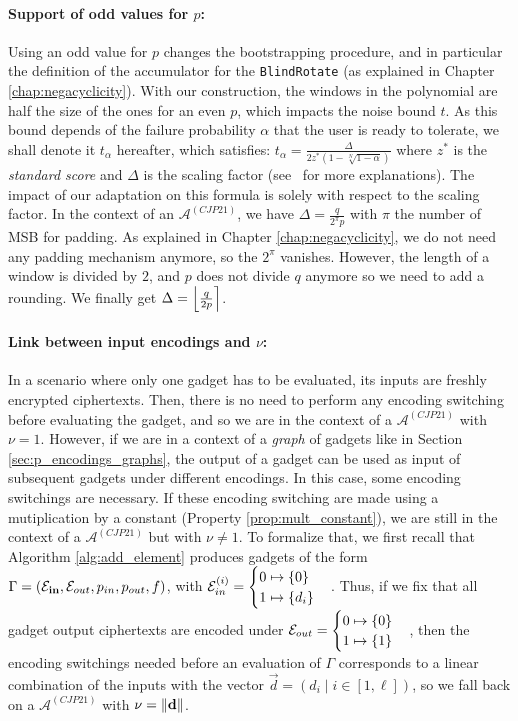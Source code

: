 \paragraph{Support of odd values for $p$:} Using an odd value for $p$ changes the bootstrapping procedure, and in particular the definition of the accumulator for the \texttt{BlindRotate} (as explained in Chapter \ref{chap:negacyclicity}). With our construction, the windows in the polynomial are half the size of the ones for an even $p$, which impacts the noise bound $t$. 
As this bound depends of the failure probability $\alpha$ that the user is ready to tolerate, we shall denote it $t_\alpha$ hereafter, which satisfies: $t_\alpha = \frac{\Delta}{2z^*(1-\sqrt[N]{1-\alpha})}$
where $z^*$ is the \emph{standard score} and $\Delta$ is the scaling factor (see~\cite{AC:CLOT21} for more explanations). The impact of our adaptation on this formula is solely with respect to the scaling factor. In the context of an $\mathcal{A}^{(CJP21)}$, we have $\Delta = \frac{q}{2^\pi p}$ with $\pi$ the number of \gls{MSB} for padding. As explained in Chapter \ref{chap:negacyclicity}, we do not need any padding mechanism anymore, so the $2^\pi$ vanishes. However, the length of a window is divided by $2$, and $p$ does not divide $q$ anymore so we need to add a rounding. We finally get $\Delta = \left \lfloor \frac{q}{2p} \right \rceil$.

%
\paragraph{Link between input encodings and $\nu$:} In a scenario where only one gadget has to be evaluated, its inputs are freshly encrypted ciphertexts. Then, there is no need to perform any encoding switching before evaluating the gadget, and so we are in the context of a $\mathcal{A}^{(CJP21)}$ with $\nu = 1$. However, if we are in a context of a \textit{graph} of gadgets like in Section \ref{sec:p_encodings_graphs}, the output of a gadget can be used as input of subsequent gadgets under different encodings. In this case, some encoding switchings are necessary. If these encoding switching are made using a mutiplication by a constant (Property \ref{prop:mult_constant}), we are still in the context of a $\mathcal{A}^{(CJP21)}$ but with $\nu \ne 1$. 
To formalize that, we first recall that Algorithm \ref{alg:add_element} produces gadgets of the form $\Gamma = \left (\mathbf{\mathcal{E}_{in}}, \mathcal{E}_{out}, p_{in}, p_{out}, f \right )$, with $\mathcal{E}_{in}^{(i)} = \begin{cases} 0 \mapsto \{0\} \\ 1 \mapsto \{d_i\} \end{cases}$. Thus, if we fix that all gadget output ciphertexts are encoded under $\mathcal{E}_{out} = \begin{cases} 0 \mapsto \{0\} \\ 1 \mapsto \{1\} \end{cases}$, then the encoding switchings needed before an evaluation of $\Gamma$ corresponds to a linear combination of the inputs with the vector $\vec d = (d_i \mid i \in [1, \ell])$, so we fall back on a $\mathcal{A}^{(CJP21)}$ with $\nu = \lVert \mathbf d \rVert$.


